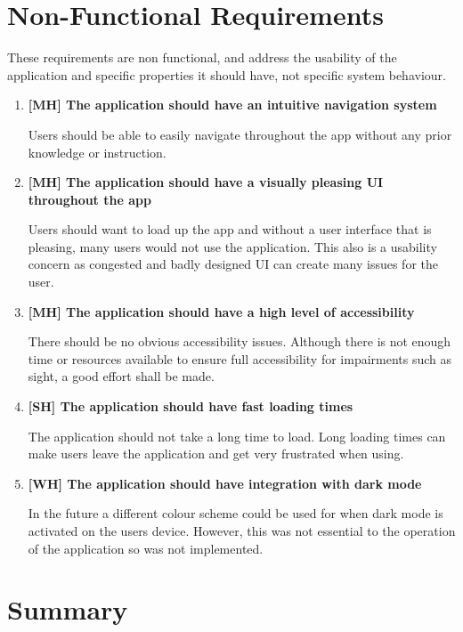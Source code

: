\section{Non-Functional Requirements} \label{non-functional}
These requirements are non functional, and address the usability of the application and specific properties it should have, not specific system behaviour. 
\begin{enumerate}
    \item \textbf{[MH] The application should have an intuitive navigation system }\par
    Users should be able to easily navigate throughout the app without any prior knowledge or instruction.
    \item \textbf{[MH] The application should have a visually pleasing UI throughout the app }\par
    Users should want to load up the app and without a user interface that is pleasing, many users would not use the application. This also is a usability concern as congested and badly designed UI can create many issues for the user.
    \item \textbf{[MH] The application should have a high level of accessibility }\par
    There should be no obvious accessibility issues. Although there is not enough time or resources available to ensure full accessibility for impairments such as sight, a good effort shall be made.
    \item \textbf{[SH] The application should have fast loading times }\par
    The application should not take a long time to load. Long loading times can make users leave the application and get very frustrated when using.
    \item \textbf{[WH] The application should have integration with dark mode }\par
    In the future a different colour scheme could be used for when dark mode is activated on the users device. However, this was not essential to the operation of the application so was not implemented. 
\end{enumerate}
\section{Summary}